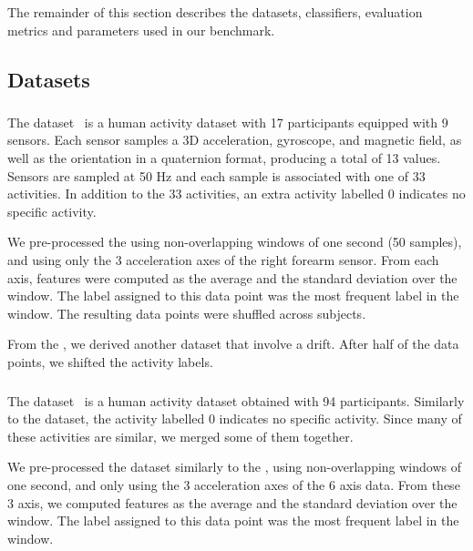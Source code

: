 The remainder of this section describes the datasets, classifiers,
evaluation metrics and parameters used in our benchmark.

\subsection{Datasets}
\subsubsection{\banosdataset}
The \banosdataset dataset~\cite{Banos_2014} is a human
activity dataset with 17 participants
equipped with 9 sensors. Each sensor samples a 3D
acceleration, gyroscope, and magnetic field, as well as 
the orientation in a quaternion format, producing a total of 13 values.
Sensors are
sampled at 50 Hz and each sample is associated
with one of 33 activities. In
addition to the 33 activities, an extra activity
labelled 0 indicates no specific activity.

We pre-processed the \banosdataset using
non-overlapping windows of one second (50
samples), and using only the 3 acceleration axes of the
right forearm sensor. From each axis, features were computed as the
average and the standard deviation over the window. The label assigned to this data
point was the most frequent label in the window.
The resulting data points were shuffled
across subjects.

From the \banosdataset, we derived another dataset
that involve a drift. After half of the data
points, we shifted the activity labels.

\subsubsection{\recofitdataset}
The \recofitdataset dataset~\cite{recofit} is a
human activity dataset obtained with 94
participants. Similarly to the \banosdataset
dataset, the activity labelled 0 indicates no
specific activity.
Since many of these activities are similar, we
merged some of them together. 

We pre-processed the dataset similarly to the
\banosdataset, using non-overlapping windows of
one second, and only using the 3 acceleration axes
of the 6 axis data. From these 3 axis, we computed
features as the average and the standard deviation
over the window. The label assigned to this data
point was the most frequent label in the window.

